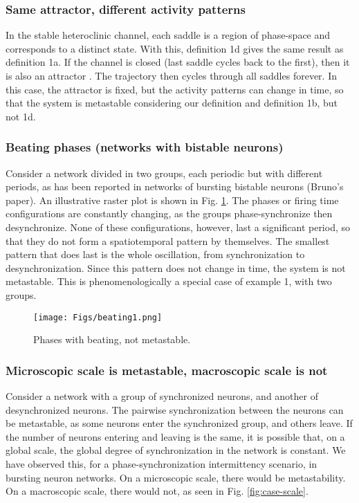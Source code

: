 \documentclass[preprint,superscriptaddress,showpacs,amsmath,amssymb,aps,pre,floatfix]{revtex4-1}
\theoremstyle{definition}
\begin{document}
\subsubsection{Same attractor, different activity patterns}
In the stable heteroclinic channel, each saddle is a region of phase-space and corresponds to a distinct state. With this, definition 1d gives the same result as definition 1a. If the channel is closed (last saddle cycles back to the first), then it is also an attractor \cite{}. The trajectory then cycles through all saddles forever. In this case, the attractor is fixed, but the activity patterns can change in time, so that the system is metastable considering our definition and definition 1b, but not 1d.

\subsubsection{Beating phases (networks with bistable neurons)}
Consider a network divided in two groups, each periodic but with different periods, as has been reported in networks of bursting bistable neurons (Bruno's paper). An illustrative raster plot is shown in Fig. \ref{fig:case-beating}. The phases or firing time configurations are constantly changing, as the groups phase-synchronize then desynchronize. None of these configurations, however, last a significant period, so that they do not form a spatiotemporal pattern by themselves. The smallest pattern that does last is the whole oscillation, from synchronization to desynchronization. Since this pattern does not change in time, the system is not metastable. This is phenomenologically a special case of example 1, with two groups.
%
\begin{figure}[H]
    \centering
    \texttt{[image: Figs/beating1.png]}
    \caption{Phases with beating, not metastable.}
    \label{fig:case-beating}
\end{figure}

\subsubsection{Microscopic scale is metastable, macroscopic scale is not}
Consider a network with a group of synchronized neurons, and another of desynchronized neurons. The pairwise synchronization between the neurons can be metastable, as some neurons enter the synchronized group, and others leave. If the number of neurons entering and leaving is the same, it is possible that, on a global scale, the global degree of synchronization in the network is constant. We have observed this, for a phase-synchronization intermittency scenario, in bursting neuron networks. 
On a microscopic scale, there would be metastability. On a macroscopic scale, there would not, as seen in Fig. \ref{fig:case-scale}.
\end{document}
